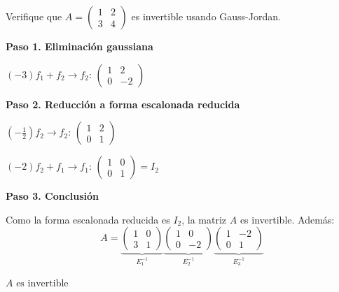 \begin{example}
Verifique que $A = \begin{pmatrix} 1 & 2 \\ 3 & 4 \end{pmatrix}$ es invertible usando Gauss-Jordan.
\begin{myproof}
\textbf{Paso 1. Eliminación gaussiana}

$(-3)f_1 + f_2 \to f_2$: $\begin{pmatrix} \boxed{1} & 2 \\ 0 & -2 \end{pmatrix}$

\textbf{Paso 2. Reducción a forma escalonada reducida}

$\left(-\tfrac{1}{2}\right) f_2 \to f_2$: $\begin{pmatrix} 1 & 2 \\ 0 & 1 \end{pmatrix}$

$(-2)f_2 + f_1 \to f_1$: $\begin{pmatrix} \boxed{1} & 0 \\ 0 & \boxed{1} \end{pmatrix} = I_2$

\textbf{Paso 3. Conclusión}

Como la forma escalonada reducida es $I_2$, la matriz $A$ es invertible. Además:
\[
A = \underbrace{\begin{pmatrix} 1 & 0 \\ 3 & 1 \end{pmatrix}}_{E_1^{-1}} \underbrace{\begin{pmatrix} 1 & 0 \\ 0 & -2 \end{pmatrix}}_{E_2^{-1}} \underbrace{\begin{pmatrix} 1 & -2 \\ 0 & 1 \end{pmatrix}}_{E_3^{-1}}
\]

$\boxed{A \text{ es invertible}}$
\end{myproof}
\end{example}

